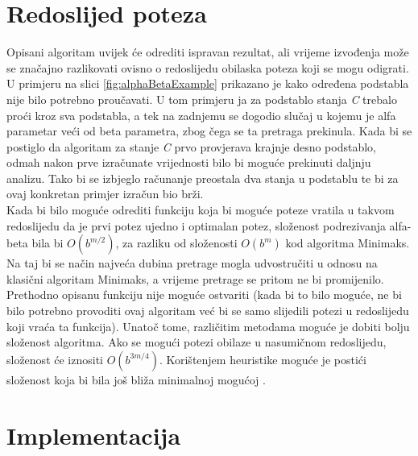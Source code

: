 \documentclass[times, utf8, seminar, numeric, tikz]{fer}
\begin{document}
\section{Redoslijed poteza}
Opisani algoritam uvijek će odrediti ispravan rezultat, ali vrijeme izvođenja može se značajno razlikovati ovisno o redoslijedu obilaska poteza koji se mogu odigrati. U primjeru na slici \ref{fig:alphaBetaExample} prikazano je kako određena podstabla nije bilo potrebno proučavati. U tom primjeru ja za podstablo stanja \textit{C} trebalo proći kroz sva podstabla, a tek na zadnjemu se dogodio slučaj u kojemu je alfa parametar veći od beta parametra, zbog čega se ta pretraga prekinula. Kada bi se postiglo da algoritam za stanje \textit{C} prvo provjerava krajnje desno podstablo, odmah nakon prve izračunate vrijednosti bilo bi moguće prekinuti daljnju analizu. Tako bi se izbjeglo računanje preostala dva stanja u podstablu te bi za ovaj konkretan primjer izračun bio brži.\\

Kada bi bilo moguće odrediti funkciju koja bi moguće poteze vratila u takvom redoslijedu da je prvi potez ujedno i optimalan potez, složenost podrezivanja alfa-beta bila bi $O(b^{m/2})$, za razliku od složenosti $O(b^m)$ kod algoritma Minimaks. Na taj bi se način najveća dubina pretrage mogla udvostručiti u odnosu na klasični algoritam Minimaks, a vrijeme pretrage se pritom ne bi promijenilo. Prethodno opisanu funkciju nije moguće ostvariti (kada bi to bilo moguće, ne bi bilo potrebno provoditi ovaj algoritam već bi se samo slijedili potezi u redoslijedu koji vraća ta funkcija). Unatoč tome, različitim metodama moguće je dobiti bolju složenost algoritma. Ako se mogući potezi obilaze u nasumičnom redoslijedu, složenost će iznositi $O(b^{3m/4})$. Korištenjem heuristike moguće je postići složenost koja bi bila još bliža minimalnoj mogućoj \cite{s.russellp.norvig2009}.

\section{Implementacija}

\begin{minipage}{\textwidth}
	
\end{minipage}
\end{document}
